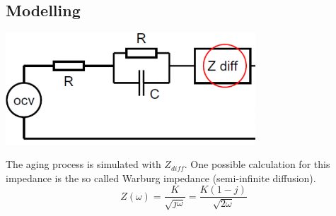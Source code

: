 \subsection{Modelling}
\begin{minipage}[lt]{7cm}
	\centering
	\includegraphics[width=0.7\textwidth]{./images/Battery_modelling.png}
\end{minipage}
\begin{minipage}[rt]{10cm}
	The aging process is simulated with $Z_{diff}$. One possible calculation for this impedance is the so called Warburg impedance (semi-infinite diffusion).
	\begin{equation*}
		Z\left(\omega\right) = \frac{K}{\sqrt{j\omega}} = \frac{K \left(1-j\right)}{\sqrt{2\omega}}
	\end{equation*}
\end{minipage}
